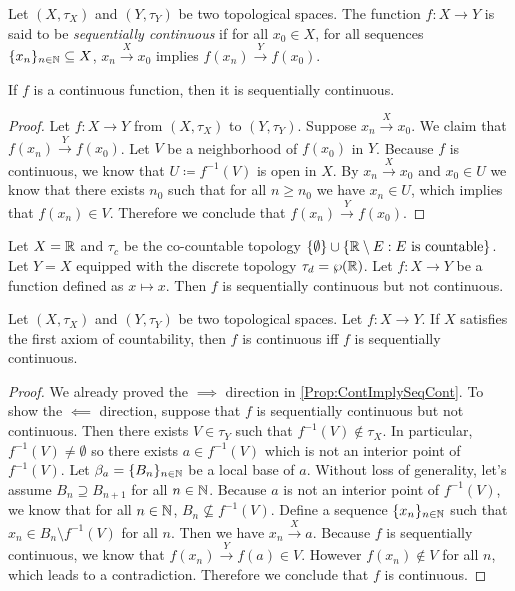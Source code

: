 \documentclass[screen]{techreport}
\numberwithin{equation}{section}
\begin{document}
\begin{definition}\label{De:SequentiallyContinuous}
	Let $(X,\tau_X)$ and $(Y,\tau_Y)$ be two topological spaces.
	The function $f : X \to Y$ is said to be \emph{sequentially continuous} if for all $x_0 \in X$, for all sequences $\{x_n\}_{n \in \mathbb{N}} \subseteq X$, $x_n \xrightarrow{X} x_0$ implies $f(x_n) \xrightarrow{Y} f(x_0)$.
\end{definition}

\begin{proposition}\label{Prop:ContImplySeqCont}
	If $f$ is a continuous function, then it is sequentially continuous.
\end{proposition}
\begin{proof}
	Let $f : X \to Y$ from $(X,\tau_X)$ to $(Y,\tau_Y)$.
	Suppose $x_n \xrightarrow{X} x_0$.
	We claim that $f(x_n) \xrightarrow{Y} f(x_0)$.
	Let $V$ be a neighborhood of $f(x_0)$ in $Y$.
	Because $f$ is continuous, we know that $U \coloneqq f^{-1}(V)$ is open in $X$.
	By $x_n \xrightarrow{X} x_0$ and $x_0 \in U$ we know that there exists $n_0$ such that for all $n \ge n_0$ we have $x_n \in U$, which implies that $f(x_n) \in V$.
	Therefore we conclude that $f(x_n) \xrightarrow{Y} f(x_0)$.
\end{proof}

\begin{example}\label{Exa:SeqContNotCont}
	Let $X = \mathbb{R}$ and $\tau_c$ be the co-countable topology $\{ \emptyset \} \cup \{ \mathbb{R} \setminus E : E~\text{is countable} \}$.
	Let $Y = X$ equipped with the discrete topology $\tau_d = \wp(\mathbb{R})$.
	Let $f : X \to Y$ be a function defined as $x \mapsto x$.
	Then $f$ is sequentially continuous but not continuous.
\end{example}

\begin{proposition}\label{Prop:FstAxCountContIffSeqCont}
	Let $(X,\tau_X)$ and $(Y,\tau_Y)$ be two topological spaces.
	Let $f : X\to Y$.
	If $X$ satisfies the first axiom of countability, then $f$ is continuous iff $f$ is sequentially continuous.
\end{proposition}
\begin{proof}
	We already proved the ${\implies}$ direction in \cref{Prop:ContImplySeqCont}.
	To show the ${\impliedby}$ direction, suppose that $f$ is sequentially continuous but not continuous.
	Then there exists $V \in \tau_Y$ such that $f^{-1}(V) \not\in \tau_X$.
	In particular, $f^{-1}(V) \neq \emptyset$ so there exists $a \in f^{-1}(V)$ which is not an interior point of $f^{-1}(V)$.
	Let $\beta_a = \{B_n\}_{n\in \mathbb{N}}$ be a local base of $a$.
	Without loss of generality, let's assume $B_n \supseteq B_{n+1}$ for all $n \in \mathbb{N}$.
	Because $a$ is not an interior point of $f^{-1}(V)$, we know that for all $n \in \mathbb{N}$, $B_n \not\subseteq f^{-1}(V)$.
	Define a sequence $\{x_n\}_{n \in \mathbb{N}}$ such that $x_n \in B_n \setminus f^{-1}(V)$ for all $n$.
	Then we have $x_n \xrightarrow{X} a$.
	Because $f$ is sequentially continuous, we know that $f(x_n) \xrightarrow{Y} f(a) \in V$.
	However $f(x_n) \not\in V$ for all $n$, which leads to a contradiction.
	Therefore we conclude that $f$ is continuous.
\end{proof}
\end{document}
